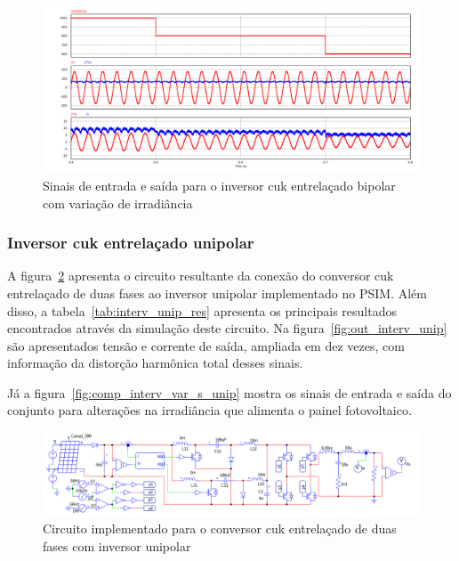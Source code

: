 \documentclass[
	12pt,				%
	openany,
	onseside,
	a4paper,			%
	english,			%
	french,				%
	spanish,			%
	brazil,				%
	]{abntex2}
\begin{document}
\begin{figure}[H]%
	\captionsetup{justification=centering}
	\centering
		\includegraphics[width= \linewidth]{comp_interv_var_s}
		\caption{Sinais de entrada e saída para o inversor cuk entrelaçado bipolar com variação de irradiância}
		\label{fig:comp_interv_var_s}
\end{figure}

\subsubsection{Inversor cuk entrelaçado unipolar}

A figura~\ref{fig:comp_interv_circ_clean_unip} apresenta o circuito resultante da conexão do conversor cuk entrelaçado de duas fases ao inversor unipolar implementado no PSIM. Além disso, a tabela~\ref{tab:interv_unip_res} apresenta os principais resultados encontrados através da simulação deste circuito. Na figura~\ref{fig:out_interv_unip} são apresentados tensão e corrente de saída, ampliada em dez vezes, com informação da distorção harmônica total desses sinais.

Já a figura~\ref{fig:comp_interv_var_s_unip} mostra os sinais de entrada e saída do conjunto para alterações na irradiância que alimenta o painel fotovoltaico.

\begin{figure}[H]%
	\captionsetup{justification=centering}
	\centering
		\includegraphics[width= \linewidth]{comp_interv_circ_clean_unip}
		\caption{Circuito implementado para o conversor cuk entrelaçado de duas fases com inversor unipolar}
		\label{fig:comp_interv_circ_clean_unip}
\end{figure}
\end{document}
